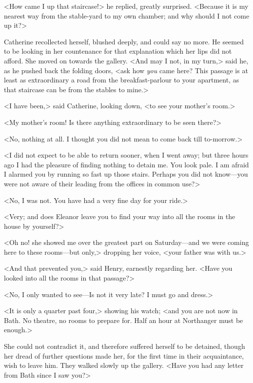  <How came I up that staircase!> he replied, greatly surprised. <Because it is my nearest way from the stable-yard to my own chamber; and why should I not come up it?> 

 Catherine recollected herself, blushed deeply, and could say no more. He seemed to be looking in her countenance for that explanation which her lips did not afford. She moved on towards the gallery. <And may I not, in my turn,> said he, as he pushed back the folding doors, <ask how \textit{you} came here? This passage is at least as extraordinary a road from the breakfast-parlour to your apartment, as that staircase can be from the stables to mine.> 

 <I have been,> said Catherine, looking down, <to see your mother's room.> 

 <My mother's room! Is there anything extraordinary to be seen there?> 

 <No, nothing at all. I thought you did not mean to come back till to-morrow.> 

 <I did not expect to be able to return sooner, when I went away; but three hours ago I had the pleasure of finding nothing to detain me. You look pale. I am afraid I alarmed you by running so fast up those stairs. Perhaps you did not know—you were not aware of their leading from the offices in common use?> 

 <No, I was not. You have had a very fine day for your ride.> 

 <Very; and does Eleanor leave you to find your way into all the rooms in the house by yourself?> 

 <Oh no! she showed me over the greatest part on Saturday—and we were coming here to these rooms—but only,> dropping her voice, <your father was with us.> 

 <And that prevented you,> said Henry, earnestly regarding her. <Have you looked into all the rooms in that passage?> 

 <No, I only wanted to see—Is not it very late? I must go and dress.> 

 <It is only a quarter past four,> showing his watch; <and you are not now in Bath. No theatre, no rooms to prepare for. Half an hour at Northanger must be enough.> 

 She could not contradict it, and therefore suffered herself to be detained, though her dread of further questions made her, for the first time in their acquaintance, wish to leave him. They walked slowly up the gallery. <Have you had any letter from Bath since I saw you?> 

